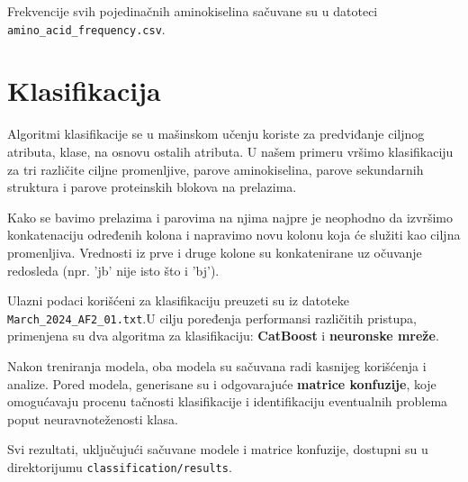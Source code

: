 \documentclass[a4paper,12pt]{article}
\begin{document}
Frekvencije svih pojedinačnih aminokiselina sačuvane su u datoteci \\ \texttt{amino\_acid\_frequency.csv}.

\newpage
\section{Klasifikacija}
Algoritmi klasifikacije se u mašinskom učenju koriste za predviđanje ciljnog atributa, klase, na osnovu ostalih atributa. U našem primeru vršimo klasifikaciju za tri različite ciljne promenljive, parove aminokiselina, parove sekundarnih struktura i parove proteinskih blokova na prelazima.

Kako se bavimo prelazima i parovima na njima najpre je neophodno da izvršimo konkatenaciju određenih kolona i napravimo novu kolonu koja će služiti kao ciljna promenljiva. Vrednosti iz prve i druge kolone su konkatenirane uz očuvanje redosleda (npr. 'jb' nije isto što i 'bj').

Ulazni podaci korišćeni za klasifikaciju preuzeti su iz datoteke \\\texttt{March\_2024\_AF2\_01.txt}.U cilju poređenja performansi različitih pristupa, primenjena su dva algoritma za klasifikaciju: \textbf{CatBoost} i \textbf{neuronske mreže}.

Nakon treniranja modela, oba modela su sačuvana radi kasnijeg korišćenja i analize. Pored modela, generisane su i odgovarajuće \textbf{matrice konfuzije}, koje omogućavaju procenu tačnosti klasifikacije i identifikaciju eventualnih problema poput neuravnoteženosti klasa. 

Svi rezultati, uključujući sačuvane modele i matrice konfuzije, dostupni su u direktorijumu \texttt{classification/results}.
\end{document}
